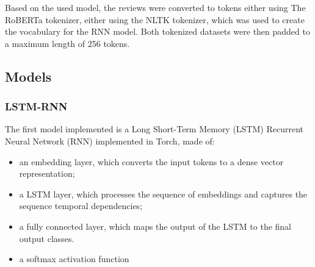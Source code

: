         Based on the used model, the reviews were converted to tokens either using The
        RoBERTa tokenizer, either using the NLTK tokenizer, which was used to create the
        vocabulary for the RNN model. Both tokenized datasets were then padded to a maximum 
        length of 256 tokens.

    \subsection{Models}
    \label{subsec:models}
        \subsubsection{LSTM-RNN}
        \label{subsubsec:lstm}
            The first model implemented is a Long Short-Term Memory (LSTM) Recurrent
            Neural Network (RNN) implemented in Torch, made of:
            \begin{itemize}
                \item an embedding layer, which converts the input tokens to a dense vector representation;
                \item a LSTM layer, which processes the sequence of embeddings and captures the sequence temporal dependencies;
                \item a fully connected layer, which maps the output of the LSTM to the final output classes.
                \item a softmax activation function
            \end{itemize}


